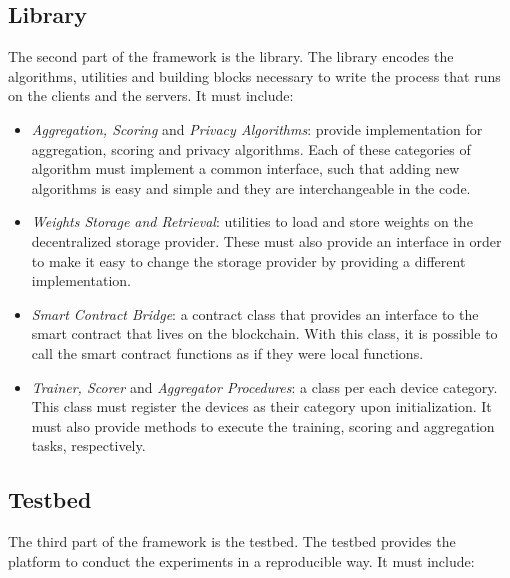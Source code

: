 \subsection{Library}\label{meth:library}

The second part of the framework is the library. The library encodes the algorithms, utilities and building blocks necessary to write the process that runs on the clients and the servers. It must include:

\begin{itemize}
    \item \textit{Aggregation, Scoring} and \textit{Privacy Algorithms}: provide implementation for aggregation, scoring and privacy algorithms. Each of these categories of algorithm must implement a common interface, such that adding new algorithms is easy and simple and they are interchangeable in the code.
    
    \item \textit{Weights Storage and Retrieval}: utilities to load and store weights on the decentralized storage provider. These must also provide an interface in order to make it easy to change the storage provider by providing a different implementation.
    
    \item \textit{Smart Contract Bridge}: a contract class that provides an interface to the smart contract that lives on the blockchain. With this class, it is possible to call the smart contract functions as if they were local functions.
    
    \item \textit{Trainer, Scorer} and \textit{Aggregator Procedures}: a class per each device category. This class must register the devices as their category upon initialization. It must also provide methods to execute the training, scoring and aggregation tasks, respectively.
\end{itemize}

\subsection{Testbed}\label{meth:testbed}

The third part of the framework is the testbed. The testbed provides the platform to conduct the experiments in a reproducible way. It must include:

